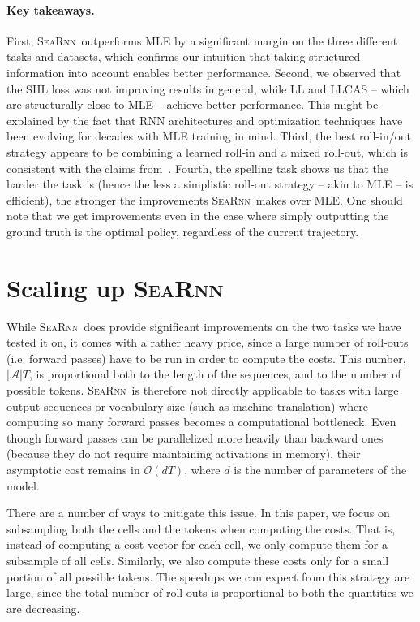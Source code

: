 \documentclass{article}
\newcommand{\SEARNN}{\textsc{SeaRnn}}
\begin{document}
	\vspace{-1mm}
	\paragraph{Key takeaways.}
	First, \SEARNN\ outperforms MLE by a significant margin on the three different tasks and datasets, which confirms our intuition that taking structured information into account enables better performance.
	Second, we observed that the SHL loss was not improving results in general, while LL and LLCAS  -- which are structurally close to MLE -- achieve better performance.
	This might be explained by the fact that RNN architectures and optimization techniques have been evolving for decades with MLE training in mind.
	Third, the best roll-in/out strategy appears to be combining a learned roll-in and a mixed roll-out, which is consistent with the claims from~\citet{Chang2015}.
	Fourth, the spelling task shows us that the harder the task is (hence the less a simplistic roll-out strategy -- akin to MLE -- is efficient), the stronger the improvements \SEARNN\ makes over MLE.
	One should note that we get improvements even in the case where simply outputting the ground truth is the optimal policy, regardless of the current trajectory.

	\vspace{-0.5mm}
	\section{Scaling up \SEARNN}\label{sec:scaling}
	\vspace{-1mm}
	While \SEARNN\ does provide significant improvements on the two tasks we have tested it on, it comes with a rather heavy price, since a large number of roll-outs (i.e. forward passes) have to be run in order to compute the costs.
	This number, $|\mathcal{A}|T$, is proportional both to the length of the sequences, and to the number of possible tokens.
	\SEARNN\ is therefore not directly applicable to tasks with large output sequences or vocabulary size (such as machine translation) where computing so many forward passes becomes a computational bottleneck.
	Even though forward passes can be parallelized more heavily than backward ones (because they do not require maintaining activations in memory), their asymptotic cost remains in $\mathcal{O}(d T)$, where $d$ is the number of parameters of the model.

	There are a number of ways to mitigate this issue.
	In this paper, we focus on subsampling both the cells and the tokens when computing the costs.
	That is, instead of computing a cost vector for each cell, we only compute them for a subsample of all cells.
	Similarly, we also compute these costs only for a small portion of all possible tokens.
	The speedups we can expect from this strategy are large, since the total number of roll-outs is proportional to both the quantities we are decreasing.
\end{document}
